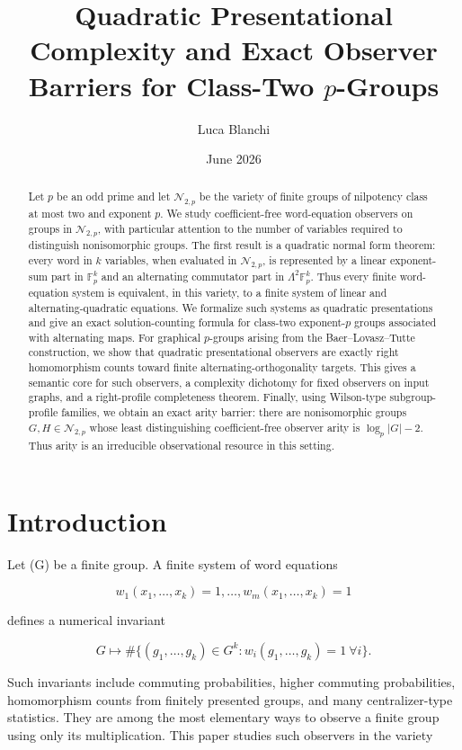 \documentclass[11pt]{article}
\title{Quadratic Presentational Complexity and Exact Observer Barriers for Class-Two $p$-Groups}
\author{Luca Blanchi}
\date{June 2026}
\begin{document}
\maketitle

\begin{abstract}
Let $p$ be an odd prime and let $\mathcal N_{2,p}$ be the variety of finite groups of nilpotency class at most two and exponent $p$. We study coefficient-free word-equation observers on groups in $\mathcal N_{2,p}$, with particular attention to the number of variables required to distinguish nonisomorphic groups. The first result is a quadratic normal form theorem: every word in $k$ variables, when evaluated in $\mathcal N_{2,p}$, is represented by a linear exponent-sum part in $\mathbb F_p^k$ and an alternating commutator part in $\Lambda^2\mathbb F_p^k$. Thus every finite word-equation system is equivalent, in this variety, to a finite system of linear and alternating-quadratic equations. We formalize such systems as quadratic presentations and give an exact solution-counting formula for class-two exponent-$p$ groups associated with alternating maps. For graphical $p$-groups arising from the Baer--Lovasz--Tutte construction, we show that quadratic presentational observers are exactly right homomorphism counts toward finite alternating-orthogonality targets. This gives a semantic core for such observers, a complexity dichotomy for fixed observers on input graphs, and a right-profile completeness theorem. Finally, using Wilson-type subgroup-profile families, we obtain an exact arity barrier: there are nonisomorphic groups $G,H\in\mathcal N_{2,p}$ whose least distinguishing coefficient-free observer arity is $\log_p |G|-2$. Thus arity is an irreducible observational resource in this setting.
\end{abstract}

\section{Introduction}

Let (G) be a finite group. A finite system of word equations

\[
w_1(x_1,\dots,x_k)=1,\dots,w_m(x_1,\dots,x_k)=1
\]

defines a numerical invariant

\[
G\longmapsto
\#\{(g_1,\dots,g_k)\in G^k:
w_i(g_1,\dots,g_k)=1\ \forall i\}.
\]

Such invariants include commuting probabilities, higher commuting probabilities, homomorphism counts from finitely presented groups, and many centralizer-type statistics. They are among the most elementary ways to observe a finite group using only its multiplication. This paper studies such observers in the variety
\end{document}
